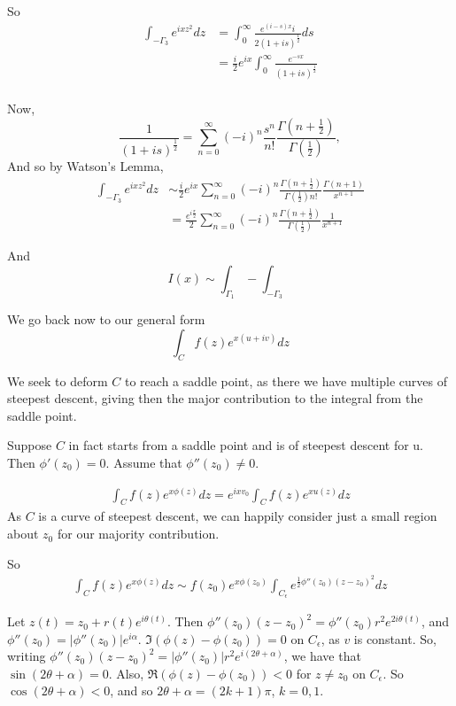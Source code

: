 \documentclass[a4paper]{article}
\begin{document}
\begin{eg}
So
\begin{align*}
	\int_{-\Gamma_3} e^{ixz^2} dz &= \int_{0}^{\infty} \frac{e^{(i-s)x} i}{2(1+is)^{\frac{1}{2}}} ds \\
	&= \frac{i}{2} e^{ix} \int_0^{\infty} \frac{e^{-sx}}{(1+is)^{\frac{1}{2}}} \\
\end{align*}

Now, 
\[
	\frac{1}{(1+is)^{\frac{1}{2}}} = \sum_{n=0}^{\infty} (-i)^{n} \frac{s^{n}}{n!} \frac{\Gamma\left(n+\frac{1}{2}\right)}{\Gamma \left( \frac{1}{2} \right)}
,\] 
And so by Watson's Lemma,
\begin{align*}
	\int_{-\Gamma_3} e^{ixz^2} dz &\sim \frac{i}{2} e^{ix} \sum_{n=0}^{\infty} (-i)^{n} \frac{\Gamma \left(n + \frac{1}{2} \right)}{\Gamma \left( \frac{1}{2} \right) n! } \frac{\Gamma \left( n+1 \right) }{x^{n+1}} \\
	&= \frac{e^{i\frac{\pi}{2}}}{2} \sum_{n=0}^{\infty} (-i)^{n} \frac{\Gamma \left( n+\frac{1}{2} \right) }{\Gamma\left( \frac{1}{2} \right) } \frac{1}{x^{n+1}}
\end{align*}

And \[
	I(x) \sim \int_{\Gamma_1} - \int_{-\Gamma_3}
\] 
\end{eg}

We go back now to our general form
\[
	\int_{C} f(z) e^{x(u+iv)} dz
\]

We seek to deform $C$ to reach a saddle point, as there we have multiple curves of steepest descent, giving then the major contribution to the integral from the saddle point.

Suppose $C$ in fact starts from a saddle point and is of steepest descent for u. Then $\phi'(z_0) = 0$. Assume that $\phi''(z_0) \neq 0$.

\begin{align*}
	\int_{C} f(z) e^{x\phi(z)} dz = e^{ixv_0} \int_{C} f(z) e^{xu(z)} dz
\end{align*}
As $C$ is a curve of steepest descent, we can happily consider just a small region about $z_0$ for our majority contribution.

So
 \begin{align*}
	 \int_{C} f(z) e^{x\phi(z)} dz \sim f(z_0) e^{x\phi(z_0)}\int_{C_\epsilon} e^{\frac{1}{2} \phi''(z_0) (z-z_0)^2} dz
\end{align*}

Let $z(t) = z_0 + r(t) e^{i\theta(t)}$. Then $\phi''(z_0) (z-z_0)^2 = \phi''(z_0) r^2 e^{2i\theta(t)}$, and $\phi''(z_0) = |\phi''(z_0)| e^{i\alpha}$. $\Im (\phi(z) - \phi(z_0)) =0 $ on $C_{\epsilon}$, as $v$ is constant. So, writing  $\phi''(z_0) (z-z_0)^2 = |\phi''(z_0)| r^2 e^{i(2\theta + \alpha)}$, we have that $\sin (2\theta + \alpha) = 0$. Also, $\Re (\phi(z) - \phi(z_0)) <0$ for $z \neq z_0$ on $C_{\epsilon}$. So $\cos(2\theta + \alpha) < 0$, and so  $2\theta + \alpha = (2k+1)\pi$, $k=0,1$.
\end{document}
